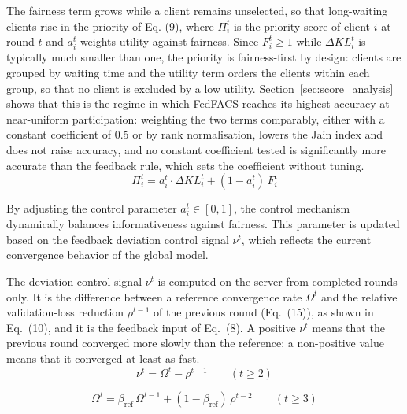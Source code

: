 \documentclass[pdflatex,sn-mathphys-num,oneside]{sn-jnl}%
\theoremstyle{thmstyleone}%
\theoremstyle{thmstyletwo}%
\theoremstyle{thmstylethree}%
\begin{document}
The fairness term grows while a client remains unselected, so that long-waiting clients rise in the priority of Eq. (9), where $\Pi_i^t$ is the priority score of client $i$ at round $t$ and $a_i^t$ weights utility against fairness. Since $F_i^t \ge 1$ while $\Delta KL_i^t$ is typically much smaller than one, the priority is fairness-first by design: clients are grouped by waiting time and the utility term orders the clients within each group, so that no client is excluded by a low utility. Section~\ref{sec:score_analysis} shows that this is the regime in which FedFACS reaches its highest accuracy at near-uniform participation: weighting the two terms comparably, either with a constant coefficient of 0.5 or by rank normalisation, lowers the Jain index and does not raise accuracy, and no constant coefficient tested is significantly more accurate than the feedback rule, which sets the coefficient without tuning.
\begin{equation}
\Pi_i^t = a_i^t \cdot \Delta KL_i^t + (1 - a_i^t)\, F_i^t
\label{eq:priority}
\end{equation}

By adjusting the control parameter $a_i^t \in [0,1]$, the control mechanism dynamically balances informativeness against fairness. This parameter is updated based on the feedback deviation control signal $\nu^t$, which reflects the current convergence behavior of the global model.

The deviation control signal $\nu^t$ is computed on the server from completed rounds only. It is the difference between a reference convergence rate $\Omega^t$ and the relative validation-loss reduction $\rho^{t-1}$ of the previous round (Eq.~(15)), as shown in Eq.~(10), and it is the feedback input of Eq.~(8). A positive $\nu^t$ means that the previous round converged more slowly than the reference; a non-positive value means that it converged at least as fast.
\begin{equation}
\nu^t = \Omega^t - \rho^{t-1}\qquad (t \ge 2)
\label{eq:deviation}
\end{equation}

\begin{equation}
\Omega^t = \beta_{\text{ref}}\,\Omega^{t-1} + (1-\beta_{\text{ref}})\,\rho^{t-2}\qquad (t \ge 3)
\label{eq:reference_rate}
\end{equation}
\end{document}
